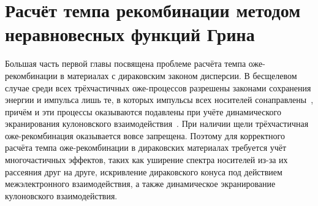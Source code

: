 \section{Расчёт темпа рекомбинации методом неравновесных функций Грина} \label{sec:NEGF}
%
%
Большая часть первой главы посвящена проблеме расчёта темпа оже-рекомбинации в материалах с дираковским законом дисперсии. В бесщелевом случае среди всех трёхчастичных оже-процессов разрешены законами сохранения энергии и импульса лишь те, в которых импульсы всех носителей сонаправлены~\cite{Rana-Auger}, причём и эти процессы оказываются подавлены при учёте динамического экранирования кулоновского взаимодействия~\cite{Tomadin-theory}. При наличии щели трёхчастичная оже-рекомбинация оказывается вовсе запрещена. Поэтому для корректного расчёта темпа оже-рекомбинации в дираковских материалах требуется учёт многочастичных эффектов, таких как уширение спектра носителей из-за их рассеяния друг на друге, искривление дираковского конуса под действием межэлектронного взаимодействия, а также динамическое экранирование кулоновского взаимодействия.

